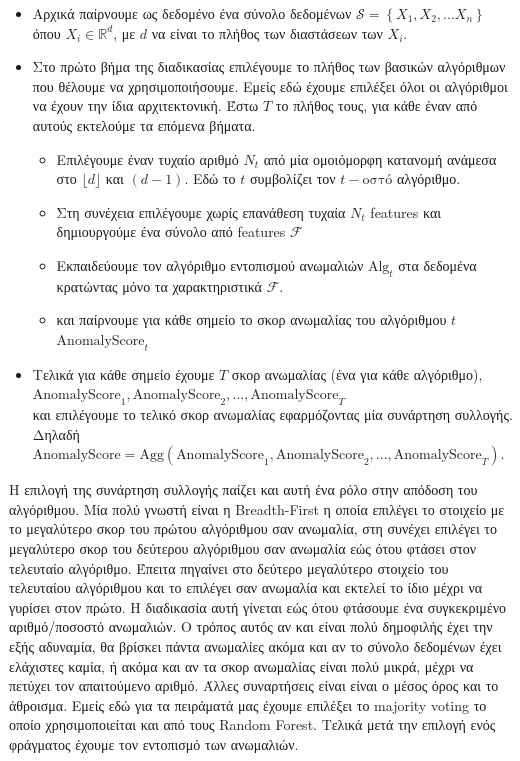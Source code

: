 \documentclass[a4paper,12pt]{report}
\theoremstyle{definitionNODot}
\begin{document}
	\begin{itemize}
		\item Αρχικά παίρνουμε ως δεδομένο ένα σύνολο δεδομένων $\mathcal{S} = \left\{ X_1, X_2,...X_n \right\}$ όπου $X_i\in\mathbb{R}^d$, με $d$ να είναι το πλήθος των διαστάσεων των $X_i$.
		\item Στο πρώτο βήμα της διαδικασίας επιλέγουμε το πλήθος των βασικών αλγόριθμων που θέλουμε να χρησιμοποιήσουμε. Εμείς εδώ έχουμε επιλέξει όλοι οι αλγόριθμοι να έχουν την ίδια αρχιτεκτονική. Έστω $T$ το πλήθος τους, για κάθε έναν από αυτούς εκτελούμε τα επόμενα βήματα.
		
		\begin{itemize}
			
			\item Επιλέγουμε έναν τυχαίο αριθμό $N_t$ από μία ομοιόμορφη κατανομή ανάμεσα στο $\lfloor d \rfloor$ και $(d-1)$. Εδώ το $t$ συμβολίζει τον $t-\text{οστό}$ αλγόριθμο.
			\item Στη συνέχεια επιλέγουμε χωρίς επανάθεση τυχαία $N_t$ features και δημιουργούμε ένα σύνολο από features $\mathcal{F}$
			\item Εκπαιδεύουμε τον αλγόριθμο εντοπισμού ανωμαλιών $\text{Alg}_t$ στα δεδομένα κρατώντας μόνο τα χαρακτηριστικά $\mathcal{F}$.
			\item και παίρνουμε για κάθε σημείο το σκορ ανωμαλίας του αλγόριθμου $t$ $\text{AnomalyScore}_t$
		\end{itemize}
		\item Τελικά για κάθε σημείο έχουμε $T$ σκορ ανωμαλίας (ένα για κάθε αλγόριθμο), \\ $\text{AnomalyScore}_1, \text{AnomalyScore}_2,...,\text{AnomalyScore}_T$ \\ και επιλέγουμε το τελικό σκορ ανωμαλίας εφαρμόζοντας μία συνάρτηση συλλογής. Δηλαδή \\ $\text{AnomalyScore} = \text{Agg}(\text{AnomalyScore}_1, \text{AnomalyScore}_2,...,\text{AnomalyScore}_T)$.
	\end{itemize}
	
	Η επιλογή της συνάρτηση συλλογής παίζει και αυτή ένα ρόλο στην απόδοση του αλγόριθμου. Μία πολύ γνωστή είναι η Βreadth-First η οποία επιλέγει το στοιχείο με το μεγαλύτερο σκορ του πρώτου αλγόριθμου σαν ανωμαλία, στη συνέχει επιλέγει το μεγαλύτερο σκορ του δεύτερου αλγόριθμου σαν ανωμαλία εώς ότου φτάσει στον τελευταίο αλγόριθμο. Έπειτα πηγαίνει στο δεύτερο μεγαλύτερο στοιχείο του τελευταίου αλγόριθμου και το επιλέγει σαν ανωμαλία και εκτελεί το ίδιο μέχρι να γυρίσει στον πρώτο. Η διαδικασία αυτή γίνεται εώς ότου φτάσουμε ένα συγκεκριμένο αριθμό/ποσοστό ανωμαλιών. Ο τρόπος αυτός αν και είναι πολύ δημοφιλής έχει την εξής αδυναμία, θα βρίσκει πάντα ανωμαλίες ακόμα και αν το σύνολο δεδομένων έχει ελάχιστες καμία, ή ακόμα και αν τα σκορ ανωμαλίας είναι πολύ μικρά, μέχρι να πετύχει τον απαιτούμενο αριθμό. Άλλες συναρτήσεις είναι είναι ο μέσος όρος και το άθροισμα. Εμείς εδώ για τα πειράματά μας έχουμε επιλέξει το majority voting το οποίο χρησιμοποιείται και από τους Random Forest. Τελικά μετά την επιλογή ενός φράγματος έχουμε τον εντοπισμό των ανωμαλιών.
	
\end{document}
